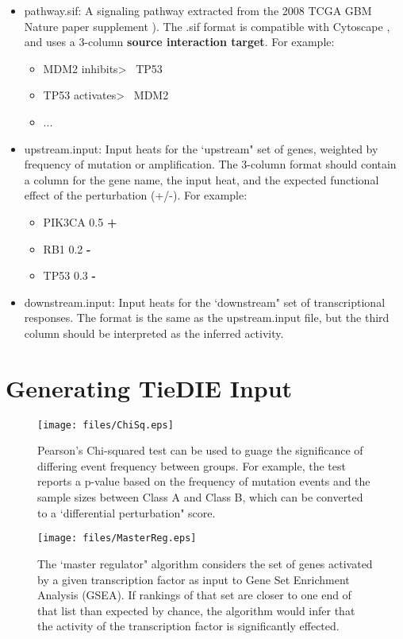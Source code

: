 \documentclass[11pt]{report}
\begin{document}
	\begin{itemize}
	\item pathway.sif: A signaling pathway extracted from the 2008 TCGA GBM Nature paper supplement \cite{TCGA08}). The .sif format is
	compatible with Cytoscape \cite{Cytoscape}, and uses a 3-column \textbf{source interaction target}. For example: 
	\begin{itemize}	
	
		\item MDM2	inhibits\textgreater	~ TP53
		\item TP53	activates\textgreater	~ MDM2
		\item ...
	\end{itemize}
	
	\item upstream.input: Input heats for the `upstream" set of genes, weighted by frequency of mutation or amplification. The 3-column format
	should contain a column for the gene name, the input heat, and the expected functional effect of the perturbation (+/-). For example:
	\begin{itemize}	
		\item PIK3CA	0.5	\textbf{+}
		\item RB1	0.2	 \textbf{-}
		\item TP53 0.3   \textbf{-}
	\end{itemize}	
	\item downstream.input: Input heats for the `downstream" set of transcriptional responses. The format is the same as the upstream.input file,
	but the third column should be interpreted as the inferred activity. 

	\end{itemize}

\section{Generating TieDIE Input}

\begin{figure}[h]
    \texttt{[image: files/ChiSq.eps]}
	\caption{Pearson's Chi-squared test can be used to guage the significance of differing event frequency between groups. For example, the test reports a p-value based
	on the frequency of mutation events and the sample sizes between Class A and Class B, which can be converted to a `differential perturbation" score. }
    \label{fig:chisq}
\end{figure}

\begin{figure}[h]
    \texttt{[image: files/MasterReg.eps]}
	\caption{The `master regulator" algorithm considers the set of genes activated by a given transcription factor as input to Gene Set Enrichment Analysis (GSEA). If rankings
	of that set are closer to one end of that list than expected by chance, the algorithm would infer that the activity of the transcription factor is significantly effected.} 
    \label{fig:masterreg}
\end{figure}
\end{document}
